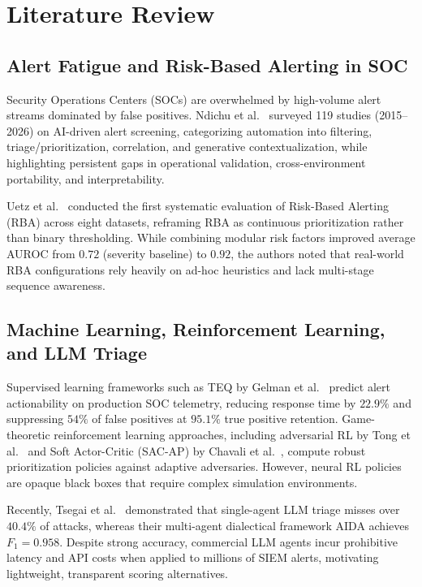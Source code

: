 %
%
\chapter{Literature Review}
\label{chap:01}
\setlength{\parskip}{0.8em}

\section{Alert Fatigue and Risk-Based Alerting in SOC}
Security Operations Centers (SOCs) are overwhelmed by high-volume alert streams dominated by false positives. Ndichu et al.~\cite{Ndichu2026} surveyed 119 studies (2015--2026) on AI-driven alert screening, categorizing automation into filtering, triage/prioritization, correlation, and generative contextualization, while highlighting persistent gaps in operational validation, cross-environment portability, and interpretability.

Uetz et al.~\cite{Uetz2026} conducted the first systematic evaluation of Risk-Based Alerting (RBA) across eight datasets, reframing RBA as continuous prioritization rather than binary thresholding. While combining modular risk factors improved average AUROC from $0.72$ (severity baseline) to $0.92$, the authors noted that real-world RBA configurations rely heavily on ad-hoc heuristics and lack multi-stage sequence awareness.

\section{Machine Learning, Reinforcement Learning, and LLM Triage}
Supervised learning frameworks such as TEQ by Gelman et al.~\cite{Gelman2023} predict alert actionability on production SOC telemetry, reducing response time by $22.9\%$ and suppressing $54\%$ of false positives at $95.1\%$ true positive retention. Game-theoretic reinforcement learning approaches, including adversarial RL by Tong et al.~\cite{Tong2019} and Soft Actor-Critic (SAC-AP) by Chavali et al.~\cite{Chavali2022}, compute robust prioritization policies against adaptive adversaries. However, neural RL policies are opaque black boxes that require complex simulation environments.

Recently, Tsegai et al.~\cite{Tsegai2026} demonstrated that single-agent LLM triage misses over $40.4\%$ of attacks, whereas their multi-agent dialectical framework AIDA achieves $F_1 = 0.958$. Despite strong accuracy, commercial LLM agents incur prohibitive latency and API costs when applied to millions of SIEM alerts, motivating lightweight, transparent scoring alternatives.

